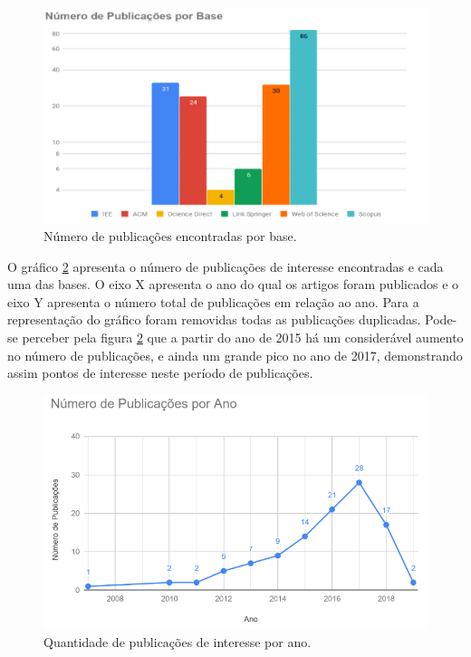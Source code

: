 \documentclass[ti,table]{texufpel} %
\begin{document}
  

\begin{figure}[ht] 

    \centering 

    \includegraphics[width=.9\textwidth]{imagens/GrafBarraPubAno.png} 

    \caption{Número de publicações encontradas por base.} 

    \label{fig:GrafBarraPubAno} 

\end{figure} 

  

  

O gráfico \ref{fig:grafPublicaAno} apresenta o número de publicações de interesse encontradas e cada uma das bases. O eixo X apresenta o ano do qual os artigos foram publicados e o eixo Y apresenta o número total de publicações em relação ao ano. Para a representação do gráfico foram removidas todas as publicações duplicadas. Pode-se perceber pela figura \ref{fig:grafPublicaAno} que a partir do ano de 2015 há um considerável aumento no número de publicações, e ainda um grande pico no ano de 2017, demonstrando assim pontos de interesse neste período de publicações. 

  

\begin{figure}[ht] 

    \centering 

    \includegraphics[width=.9\textwidth]{imagens/grafPublicaAno.png} 

    \caption{Quantidade de publicações de interesse por ano.} 

    \label{fig:grafPublicaAno} 

\end{figure} 
\end{document}
